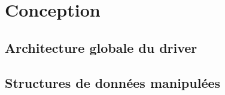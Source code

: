 \section{Conception}

\subsection{Architecture globale du driver}
\vfill
\pagebreak
\pagebreak

\subsection{Structures de données manipulées}
\vfill
\pagebreak
\pagebreak
